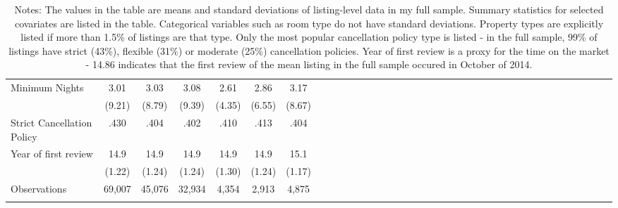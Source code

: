{\begin{longtable}{l*{6}{c|c|cccc}}
Minimum Nights   &   3.01  &      3.03		&      3.08 &      2.61  &      2.86  	& 	3.17\\
							&  (9.21)  & (8.79)     &     (9.39)         &     (4.35)         &     (6.55)         &     (8.67)         \\
Strict Cancellation Policy   &   .430  &      .404		&      .402 &      .410  &      .413  	& 	.404\\
[1em]
Year of first review    & 14.9   &      14.9	&      14.9  &      14.9		&    14.9 		&	 15.1\\
							& (1.22)    &     (1.24)         &     (1.24)         &     (1.30)         &     (1.24)         & (1.17)\\

\hline
Observations  & 69,007  & 45,076   &       32,934         &       4,354         &       2,913   & 4,875      \\
\hline\hline
\caption*{Notes: The values in the table are means and standard deviations of listing-level data in my full sample. Summary statistics for selected covariates are listed in the table. Categorical variables such as room type do not have standard deviations. Property types are explicitly listed if more than 1.5\% of listings are that type. Only the most popular cancellation policy type is listed - in the full sample, 99\% of listings have strict (43\%), flexible (31\%) or moderate (25\%) cancellation policies. Year of first review is a proxy for the time on the market - 14.86 indicates that the first review of the mean listing in the full sample occured in October of 2014.}

\end{longtable}
}
\normalsize



